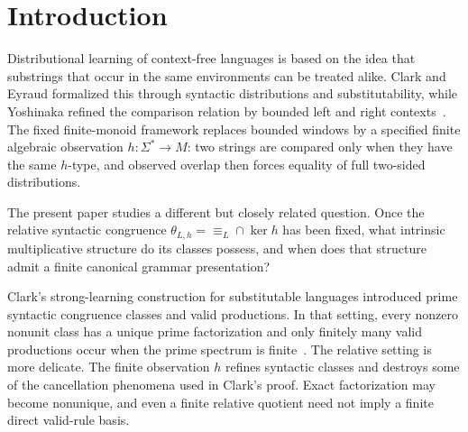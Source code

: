 \documentclass[11pt,a4paper]{article}
\begin{document}
\section{Introduction}

Distributional learning of context-free languages is based on the idea that substrings that occur in the same environments can be treated alike.  Clark and Eyraud formalized this through syntactic distributions and substitutability, while Yoshinaka refined the comparison relation by bounded left and right contexts~\cite{ClarkEyraud2007,Yoshinaka2008}.  The fixed finite-monoid framework replaces bounded windows by a specified finite algebraic observation $h:\Sigma^*\to M$: two strings are compared only when they have the same $h$-type, and observed overlap then forces equality of full two-sided distributions.

The present paper studies a different but closely related question.  Once the relative syntactic congruence
\(\theta_{L,h}=\equiv_L\cap\ker h\)
has been fixed, what intrinsic multiplicative structure do its classes possess, and when does that structure admit a finite canonical grammar presentation?

Clark's strong-learning construction for substitutable languages introduced prime syntactic congruence classes and valid productions.  In that setting, every nonzero nonunit class has a unique prime factorization and only finitely many valid productions occur when the prime spectrum is finite~\cite{Clark2013Trees}.  The relative setting is more delicate.  The finite observation $h$ refines syntactic classes and destroys some of the cancellation phenomena used in Clark's proof.  Exact factorization may become nonunique, and even a finite relative quotient need not imply a finite direct valid-rule basis.
\end{document}
